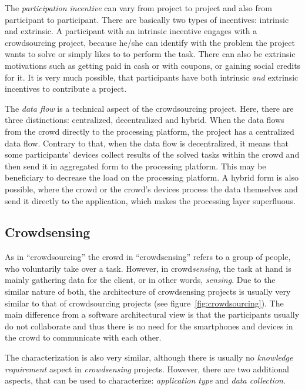 The \textit{participation incentive} can vary from project to project and also from participant to participant.
There are basically two types of incentives: intrinsic and extrinsic.
A participant with an intrinsic incentive engages with a crowdsourcing project, because he/she can identify with the problem the project wants to solve or simply likes to to perform the task.
There can also be extrinsic motivations such as getting paid in cash or with coupons, or gaining social credits for it.
It is very much possible, that participants have both intrinsic \textit{and} extrinsic incentives to contribute a project.

The \textit{data flow} is a technical aspect of the crowdsourcing project.
Here, there are three distinctions: centralized, decentralized and hybrid.
When the data flows from the crowd directly to the processing platform, the project has a centralized data flow.
Contrary to that, when the data flow is decentralized, it means that some participants' devices collect results of the solved tasks within the crowd and then send it in aggregated form to the processing platform.
This may be beneficiary to decrease the load on the processing platform.
A hybrid form is also possible, where the crowd or the crowd's devices process the data themselves and send it directly to the application, which makes the processing layer superfluous. 

\subsection*{Crowdsensing}
As in ``crowdsourcing'' the crowd in ``crowdsensing'' refers to a group of people, who voluntarily take over a task.
However, in crowd\textit{sensing}, the task at hand is mainly gathering data for the client, or in other words, \textit{sensing}.
Due to the similar nature of both, the architecture of crowdsensing projects is usually very similar to that of crowdsourcing projects (see figure~\ref{fig:crowdsourcing}).
The main difference from a software architectural view is that the participants usually do not collaborate and thus there is no need for the smartphones and devices in the crowd to communicate with each other.

The characterization is also very similar, although there is usually no \textit{knowledge requirement} aspect in \textit{crowdsensing} projects.
However, there are two additional aspects, that can be used to characterize: \textit{application type} and \textit{data collection}.

